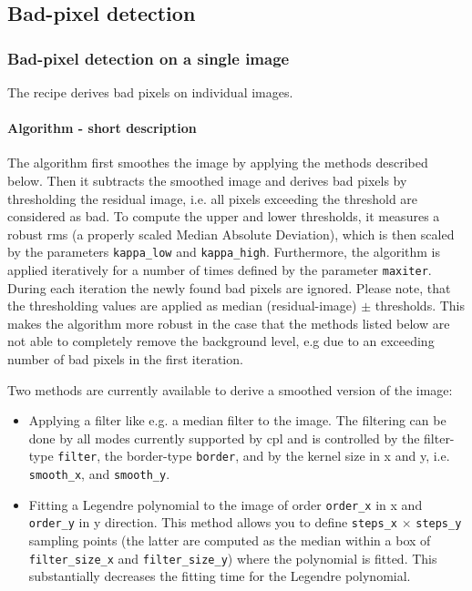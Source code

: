 \subsection{Bad-pixel detection}
\label{sec:bpm:main}

\subsubsection{Bad-pixel detection on a single image}
\label{sec:bpm_2d}
The recipe derives bad pixels on individual images.

\paragraph{Algorithm - short description}


The algorithm first smoothes the image by applying the methods
described below. Then it subtracts the smoothed image and derives bad
pixels by thresholding the residual image, i.e. all pixels exceeding
the threshold are considered as bad. To compute the upper and lower
thresholds, it measures a robust rms (a properly scaled Median Absolute
Deviation), which is then scaled by the parameters \verb,kappa_low, and
\verb,kappa_high,. Furthermore, the algorithm is applied iteratively
for a number of times defined by the parameter \verb,maxiter,. During each iteration the newly found
bad pixels are ignored. Please note, that the thresholding values are
applied as median (residual-image) $\pm$ thresholds. This makes the
algorithm more robust in the case that the methods listed below are
not able to completely remove the background level, e.g due to an
exceeding number of bad pixels in the first iteration.
 
Two methods are currently available to derive a smoothed version of
the image:
\begin{itemize}
\item Applying a filter like e.g. a median filter to the image. The
  filtering can be done by all modes currently supported by cpl and is
  controlled by the filter-type \verb,filter,, the border-type
  \verb,border,, and by the kernel size in x and y, i.e.
  \verb,smooth_x,, and \verb,smooth_y,.
\item Fitting a Legendre polynomial to the image of order
  \verb,order_x, in x and \verb,order_y, in y direction.  This method
  allows you to define \verb,steps_x, $\times$ \verb,steps_y, sampling
  points (the latter are computed as the median within a box of
  \verb,filter_size_x, and \verb,filter_size_y,) where the polynomial
  is fitted. This substantially decreases the fitting time for the
  Legendre polynomial.
\end{itemize}


